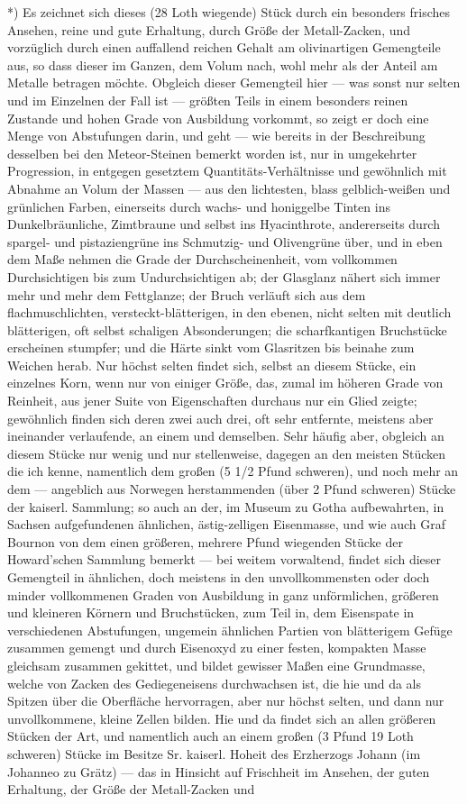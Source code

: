 \documentclass[a4paper, 11pt, oneside, german]{article}
\begin{document}
*) Es zeichnet sich dieses (28 Loth wiegende) Stück durch ein besonders frisches Ansehen, reine und gute Erhaltung, durch Größe der Metall-Zacken, und vorzüglich durch einen auffallend reichen Gehalt am olivinartigen Gemengteile aus, so dass dieser im Ganzen, dem Volum nach, wohl mehr als der Anteil am Metalle betragen möchte. Obgleich dieser Gemengteil hier --- was sonst nur selten und im Einzelnen der Fall ist --- größten Teils in einem besonders reinen Zustande und hohen Grade von Ausbildung vorkommt, so zeigt er doch eine Menge von Abstufungen darin, und geht --- wie bereits in der Beschreibung desselben bei den Meteor-Steinen bemerkt worden ist, nur in umgekehrter Progression, in entgegen gesetztem Quantitäts-Verhältnisse und gewöhnlich mit Abnahme an Volum der Massen --- aus den lichtesten, blass gelblich-weißen und grünlichen Farben, einerseits durch wachs- und honiggelbe Tinten ins Dunkelbräunliche, Zimtbraune und selbst ins Hyacinthrote, andererseits durch spargel- und pistaziengrüne ins Schmutzig- und Olivengrüne über, und in eben dem Maße nehmen die Grade der Durchscheinenheit, vom vollkommen Durchsichtigen bis zum Undurchsichtigen ab; der Glasglanz nähert sich immer mehr und mehr dem Fettglanze; der Bruch verläuft sich aus dem flachmuschlichten, versteckt-blätterigen, in den ebenen, nicht selten mit deutlich blätterigen, oft selbst schaligen Absonderungen; die scharfkantigen Bruchstücke erscheinen stumpfer; und die Härte sinkt vom Glasritzen bis beinahe zum Weichen herab. Nur höchst selten findet sich, selbst an diesem Stücke, ein einzelnes Korn, wenn nur von einiger Größe, das, zumal im höheren Grade von Reinheit, aus jener Suite von Eigenschaften durchaus nur ein Glied zeigte; gewöhnlich finden sich deren zwei auch drei, oft sehr entfernte, meistens aber ineinander verlaufende, an einem und demselben. Sehr häufig aber, obgleich an diesem Stücke nur wenig und nur stellenweise, dagegen an den meisten Stücken die ich kenne, namentlich dem großen (5 1/2 Pfund schweren), und noch mehr an dem --- angeblich aus Norwegen herstammenden (über 2 Pfund schweren) Stücke der kaiserl. Sammlung; so auch an der, im Museum zu Gotha aufbewahrten, in Sachsen aufgefundenen ähnlichen, ästig-zelligen Eisenmasse, und wie auch Graf Bournon von dem einen größeren, mehrere Pfund wiegenden Stücke der Howard'schen Sammlung bemerkt --- bei weitem vorwaltend, findet sich dieser Gemengteil in ähnlichen, doch meistens in den unvollkommensten oder doch minder vollkommenen Graden von Ausbildung in ganz unförmlichen, größeren und kleineren Körnern und Bruchstücken, zum Teil in, dem Eisenspate in verschiedenen Abstufungen, ungemein ähnlichen Partien von blätterigem Gefüge zusammen gemengt und durch Eisenoxyd zu einer festen, kompakten Masse gleichsam zusammen gekittet, und bildet gewisser Maßen eine Grundmasse, welche von Zacken des Gediegeneisens durchwachsen ist, die hie und da als Spitzen über die Oberfläche hervorragen, aber nur höchst selten, und dann nur unvollkommene, kleine Zellen bilden. Hie und da findet sich an allen größeren Stücken der Art, und namentlich auch an einem großen (3 Pfund 19 Loth schweren) Stücke im Besitze Sr. kaiserl. Hoheit des Erzherzogs Johann (im Johanneo zu Grätz) --- das in Hinsicht auf Frischheit im Ansehen, der guten Erhaltung, der Größe der Metall-Zacken und 
\end{document}
